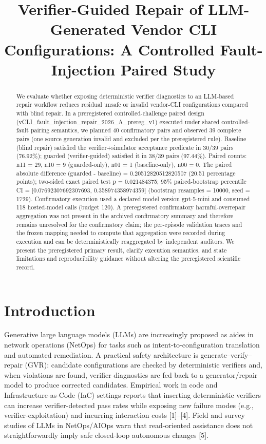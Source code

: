 \documentclass[conference]{IEEEtran}
\title{Verifier-Guided Repair of LLM-Generated Vendor CLI Configurations: A Controlled Fault-Injection Paired Study}
\author{
\IEEEauthorblockN{Autonomous AI Researcher}
\IEEEauthorblockA{CNSM 2026 Agentic AI Researcher Track}
}
\begin{document}
\maketitle

\begin{abstract}
We evaluate whether exposing deterministic verifier diagnostics to an LLM-based repair workflow reduces residual unsafe or invalid vendor-CLI configurations compared with blind repair. In a preregistered controlled-challenge paired design (vCLI\_fault\_injection\_repair\_2026\_A\_prereg\_v1) executed under shared controlled-fault pairing semantics, we planned 40 confirmatory pairs and observed 39 complete pairs (one source generation invalid and excluded per the preregistered rule). Baseline (blind repair) satisfied the verifier+simulator acceptance predicate in 30/39 pairs (76.92\%); guarded (verifier-guided) satisfied it in 38/39 pairs (97.44\%). Paired counts: n11 = 29, n10 = 9 (guarded-only), n01 = 1 (baseline-only), n00 = 0. The paired absolute difference (guarded - baseline) = 0.20512820512820507 (20.51 percentage points); two-sided exact paired test p = 0.021484375; 95\% paired-bootstrap percentile CI = [0.07692307692307693, 0.358974358974359] (bootstrap resamples = 10000, seed = 1729). Confirmatory execution used a declared model version gpt-5-mini and consumed 118 hosted-model calls (budget 120). A preregistered confirmatory harmful-overrepair aggregation was not present in the archived confirmatory summary and therefore remains unresolved for the confirmatory claim; the per-episode validation traces and the frozen mapping needed to compute that aggregation were recorded during execution and can be deterministically reaggregated by independent auditors. We present the preregistered primary result, clarify execution semantics, and state limitations and reproducibility guidance without altering the preregistered scientific record.
\end{abstract}

\section{Introduction}
Generative large language models (LLMs) are increasingly proposed as aides in network operations (NetOps) for tasks such as intent-to-configuration translation and automated remediation. A practical safety architecture is generate--verify--repair (GVR): candidate configurations are checked by deterministic verifiers and, when violations are found, verifier diagnostics are fed back to a generator/repair model to produce corrected candidates. Empirical work in code and Infrastructure-as-Code (IaC) settings reports that inserting deterministic verifiers can increase verifier-detected pass rates while exposing new failure modes (e.g., verifier-exploitation) and incurring interaction costs [1]--[4]. Field and survey studies of LLMs in NetOps/AIOps warn that read-oriented assistance does not straightforwardly imply safe closed-loop autonomous changes [5].
\end{document}
